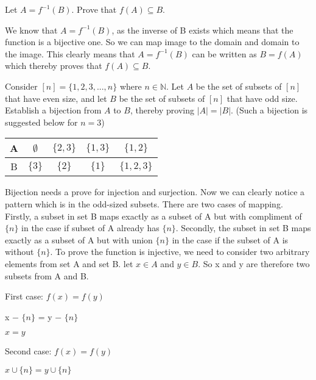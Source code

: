 \documentclass[addpoints]{exam}
\begin{document}
\begin{questions}
\begin{parts}
\begin{solution}
    
  \end{solution}

\end{parts}

\question[15] Let $A = f^{-1}(B)$. Prove that $f(A) \subseteq B$.
  \begin{solution}
        We know that $A = f^{-1}(B)$, as the inverse of B exists which means that the function is a bijective one. So we can map image to the domain and domain to the image. This clearly means that $A = f^{-1}(B)$ can be written as  $B = f(A)$ which thereby proves that $f(A) \subseteq B$. 
  \end{solution}

\question[15] Consider $[n] = \{1,2,3,...,n\}$ where $n \in \mathbb{N}$. Let $A$ be the set of subsets of $[n]$ that have even size, and let $B$ be the set of subsets of $[n]$ that have odd size. Establish a bijection from $A$ to $B$, thereby proving $|A| = |B|$. (Such a bijection is suggested below for $n = 3$) 

\begin{center}

  \begin{tabular}{ |c || c | c | c |c |}
    \hline
 A & $\emptyset$ & $\{2,3\}$ & $\{1,3\}$ & $\{1,2\}$ \\ \hline
 B & $\{3\}$ & $\{2\}$ & $\{1\}$ & $\{1,2,3\}$\\\hline
\end{tabular}
\end{center}

  \begin{solution}
    Bijection needs a prove for injection and surjection.  Now we can clearly notice a pattern which is in the odd-sized subsets. There are two cases of mapping. Firstly, a subset in set B maps exactly as a subset of A but with compliment of $\{n\}$ in the case if subset of A already has $\{n\}$. Secondly, the subset in set B maps exactly as a subset of A but with union $\{n\}$ in the case if the subset of A is without $\{n\}$. To prove the function is injective, we need to consider two arbitrary elements from set A and set B. let $x \in A$ and $y \in B$. So x and y are therefore two subsets from A and B.

First case:
$f(x)=f(y)$

x − $\{n\}$ = y −  $\{n\}$

$x=y$ 

Second case:
$f(x)=f(y)$

$x\cup \{n\}=y \cup \{n\}$


\end{solution}
\end{questions}
\end{document}
